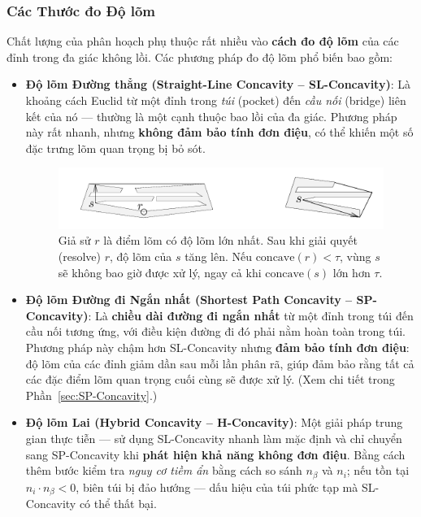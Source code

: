 \documentclass{article}
\begin{document}
\subsubsection{Các Thước đo Độ lõm}
\label{sec:MEASURING-CONCAVITY}

Chất lượng của phân hoạch phụ thuộc rất nhiều vào \textbf{cách đo độ lõm} của các đỉnh trong đa giác không lồi. Các phương pháp đo độ lõm phổ biến bao gồm:

\begin{itemize}
    \item \textbf{Độ lõm Đường thẳng (Straight-Line Concavity – SL-Concavity)}:  
    Là khoảng cách Euclid từ một đỉnh trong \textit{túi} (pocket) đến \textit{cầu nối} (bridge) liên kết của nó — thường là một cạnh thuộc bao lồi của đa giác.  
    Phương pháp này rất nhanh, nhưng \textbf{không đảm bảo tính đơn điệu}, có thể khiến một số đặc trưng lõm quan trọng bị bỏ sót.

    \begin{figure}[H]
        \centering
        \includegraphics[width=0.7\linewidth]{imgs/ACD-2.png}
        \caption{%
            Giả sử $r$ là điểm lõm có độ lõm lớn nhất. 
            Sau khi giải quyết (resolve) $r$, độ lõm của $s$ tăng lên. 
            Nếu $\text{concave}(r) < \tau$, vùng $s$ sẽ không bao giờ được xử lý, 
            ngay cả khi $\text{concave}(s)$ lớn hơn $\tau$.%
        }
        \label{fig:nonmonotonic-concavity}
    \end{figure}

    \item \textbf{Độ lõm Đường đi Ngắn nhất (Shortest Path Concavity – SP-Concavity)}:  
    Là \textbf{chiều dài đường đi ngắn nhất} từ một đỉnh trong túi đến cầu nối tương ứng, với điều kiện đường đi đó phải nằm hoàn toàn trong túi.  
    Phương pháp này chậm hơn SL-Concavity nhưng \textbf{đảm bảo tính đơn điệu}: độ lõm của các đỉnh giảm dần sau mỗi lần phân rã, 
    giúp đảm bảo rằng tất cả các đặc điểm lõm quan trọng cuối cùng sẽ được xử lý.  
    (Xem chi tiết trong Phần~\ref{sec:SP-Concavity}.)

    \item \textbf{Độ lõm Lai (Hybrid Concavity – H-Concavity)}:  
    Một giải pháp trung gian thực tiễn — sử dụng SL-Concavity nhanh làm mặc định và chỉ chuyển sang SP-Concavity khi \textbf{phát hiện khả năng không đơn điệu}. Bằng cách thêm bước kiểm tra \textit{nguy cơ tiềm ẩn} bằng cách so sánh $n_\beta$ và $n_i$; nếu tồn tại $n_i \cdot n_\beta < 0$, biên túi bị đảo hướng — dấu hiệu của túi phức tạp mà SL-Concavity có thể thất bại.


\end{itemize}
\end{document}
